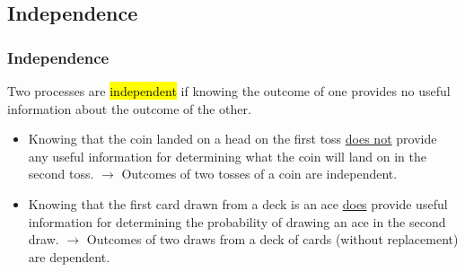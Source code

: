 \documentclass[slidestop,compress,mathserif]{beamer}
\begin{document}

\subsection{Independence}


\begin{frame}
\frametitle{Independence}

Two processes are \hl{independent} if knowing the outcome of one provides no useful information about the outcome of the other.

\pause

\begin{itemize}

\item Knowing that the coin landed on a head on the first toss \underline{does not} provide any useful information for determining what the coin will land on in the second toss. $\rightarrow$ Outcomes of two tosses of a coin are independent.

\pause

\item Knowing that the first card drawn from a deck is an ace \underline{does} provide useful information for determining the probability of drawing an ace in the second draw. $\rightarrow$ Outcomes of two draws from a deck of cards (without replacement) are dependent.

\end{itemize}

\end{frame}




\end{document}
